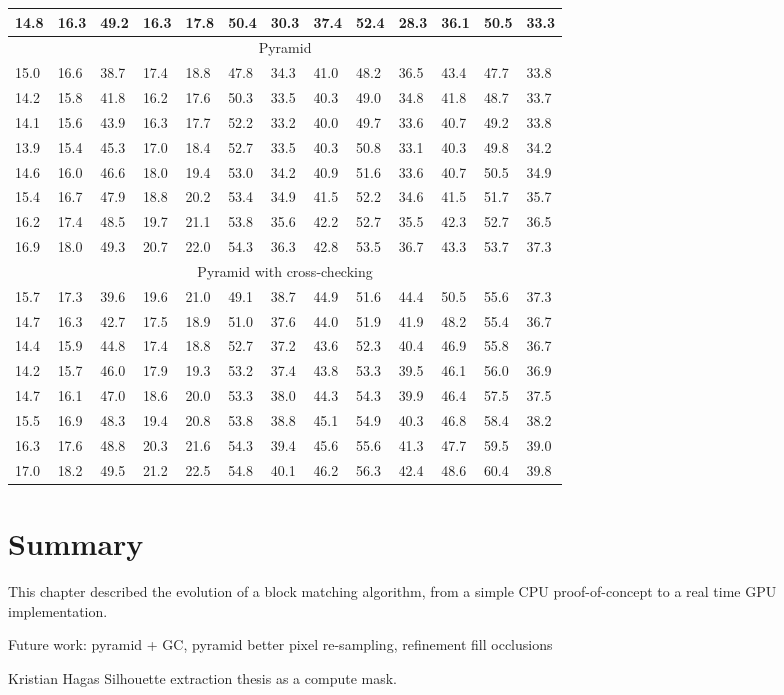 \begin{tabular}{|l|l|l||l|l|l||l|l|l||l|l|l||l|}
  14.8 & 16.3 & 49.2 & 16.3 & 17.8 & 50.4 & 30.3 & 37.4 & 52.4 & 28.3 & 36.1 & 50.5 & 33.3 \\
  \hline
  \multicolumn{13}{|c|}{Pyramid} \\
  \hline
  15.0 & 16.6 & 38.7 & 17.4 & 18.8 & 47.8 & 34.3 & 41.0 & 48.2 & 36.5 & 43.4 & 47.7 & 33.8 \\
  14.2 & 15.8 & 41.8 & 16.2 & 17.6 & 50.3 & 33.5 & 40.3 & 49.0 & 34.8 & 41.8 & 48.7 & 33.7 \\
  14.1 & 15.6 & 43.9 & 16.3 & 17.7 & 52.2 & 33.2 & 40.0 & 49.7 & 33.6 & 40.7 & 49.2 & 33.8 \\
  13.9 & 15.4 & 45.3 & 17.0 & 18.4 & 52.7 & 33.5 & 40.3 & 50.8 & 33.1 & 40.3 & 49.8 & 34.2 \\
  14.6 & 16.0 & 46.6 & 18.0 & 19.4 & 53.0 & 34.2 & 40.9 & 51.6 & 33.6 & 40.7 & 50.5 & 34.9 \\
  15.4 & 16.7 & 47.9 & 18.8 & 20.2 & 53.4 & 34.9 & 41.5 & 52.2 & 34.6 & 41.5 & 51.7 & 35.7 \\
  16.2 & 17.4 & 48.5 & 19.7 & 21.1 & 53.8 & 35.6 & 42.2 & 52.7 & 35.5 & 42.3 & 52.7 & 36.5 \\
  16.9 & 18.0 & 49.3 & 20.7 & 22.0 & 54.3 & 36.3 & 42.8 & 53.5 & 36.7 & 43.3 & 53.7 & 37.3 \\
  \hline
  \multicolumn{13}{|c|}{Pyramid with cross-checking} \\
  \hline
  15.7 & 17.3 & 39.6 & 19.6 & 21.0 & 49.1 & 38.7 & 44.9 & 51.6 & 44.4 & 50.5 & 55.6 & 37.3 \\
  14.7 & 16.3 & 42.7 & 17.5 & 18.9 & 51.0 & 37.6 & 44.0 & 51.9 & 41.9 & 48.2 & 55.4 & 36.7 \\
  14.4 & 15.9 & 44.8 & 17.4 & 18.8 & 52.7 & 37.2 & 43.6 & 52.3 & 40.4 & 46.9 & 55.8 & 36.7 \\
  14.2 & 15.7 & 46.0 & 17.9 & 19.3 & 53.2 & 37.4 & 43.8 & 53.3 & 39.5 & 46.1 & 56.0 & 36.9 \\
  14.7 & 16.1 & 47.0 & 18.6 & 20.0 & 53.3 & 38.0 & 44.3 & 54.3 & 39.9 & 46.4 & 57.5 & 37.5 \\
  15.5 & 16.9 & 48.3 & 19.4 & 20.8 & 53.8 & 38.8 & 45.1 & 54.9 & 40.3 & 46.8 & 58.4 & 38.2 \\
  16.3 & 17.6 & 48.8 & 20.3 & 21.6 & 54.3 & 39.4 & 45.6 & 55.6 & 41.3 & 47.7 & 59.5 & 39.0 \\
  17.0 & 18.2 & 49.5 & 21.2 & 22.5 & 54.8 & 40.1 & 46.2 & 56.3 & 42.4 & 48.6 & 60.4 & 39.8 \\

  \hline
\end{tabular}


\section{Summary}

This chapter described the evolution of a block matching algorithm,
from a simple CPU proof-of-concept to a real time GPU implementation.



Future work: pyramid + GC, pyramid better pixel re-sampling,
refinement fill occlusions

Kristian Hagas Silhouette extraction thesis as a compute mask.
